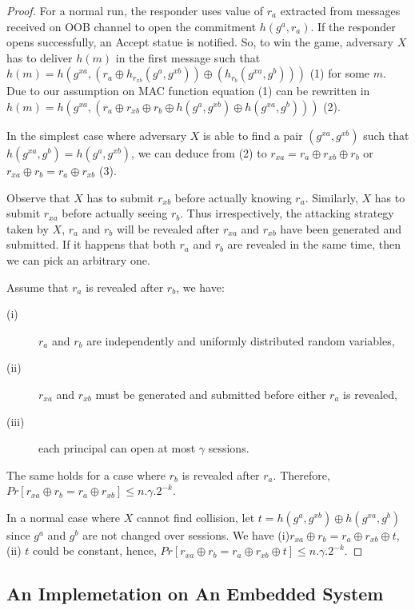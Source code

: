 \begin{proof}
For a normal run, the responder uses value of $r_a$ extracted from messages received on OOB channel to open the commitment $h(g^a, r_a)$. If the responder opens successfully, an Accept statue is notified. So, to win the game, adversary $X$ has to deliver $h(m)$ in the first message such that $h(m) = h(g^{xa}, (r_a \oplus h_{r_{xb}}(g^a,g^{xb})) \oplus (h_{r_b}(g^{xa},g^b)))$ (1) for some $m$. Due to our assumption on MAC function equation (1) can be rewritten in $h(m) = h(g^{xa}, (r_a \oplus r_{xb} \oplus r_b \oplus h(g^a,g^{xb}) \oplus h(g^{xa},g^b)))$ (2). 

In the simplest case where adversary $X$ is able to find a pair $(g^{xa},g^{xb})$ such that $h(g^{xa},g^b) = h(g^a,g^{xb})$, we can deduce from (2) to $r_{xa} = r_a \oplus r_{xb} \oplus r_b$ or $r_{xa} \oplus r_b = r_a \oplus r_{xb}$ (3).

Observe that $X$ has to submit $r_{xb}$ before actually knowing $r_a$. Similarly, $X$ has to submit $r_{xa}$ before actually seeing $r_b$. Thus irrespectively, the attacking strategy taken by $X$, $r_a$ and $r_b$ will be revealed after $r_{xa}$ and $r_{xb}$ have been generated and submitted. If it happens that both $r_a$ and $r_b$ are revealed in the same time, then we can pick an arbitrary one. 

Assume that $r_a$ is revealed after $r_b$, we have:
\begin{description}
 \item [(i)] $r_a$ and $r_b$ are independently and uniformly distributed random variables, 
 \item [(ii)] $r_{xa}$ and $r_{xb}$ must be generated and submitted before either $r_a$ is revealed, 
 \item [(iii)] each principal can open at most $\gamma$ sessions. 
\end{description}
The same holds for a case where $r_b$ is revealed after $r_a$. Therefore, $Pr[r_{xa} \oplus r_b = r_a \oplus r_{xb}] \leq n.\gamma.2^{-k}$.

In a normal case where $X$ cannot find collision, let $t= h(g^a,g^{xb}) \oplus h(g^{xa},g^b)$ since $g^a$ and $g^b$ are not changed over sessions. We have (i)$r_{xa} \oplus r_b = r_a \oplus r_{xb} \oplus t $, (ii) $t$ could be constant, hence, $Pr[r_{xa} \oplus r_b = r_a \oplus r_{xb} \oplus t ] \leq n.\gamma.2^{-k}$. 
\end{proof}

\subsection{An Implemetation on An Embedded System} 

